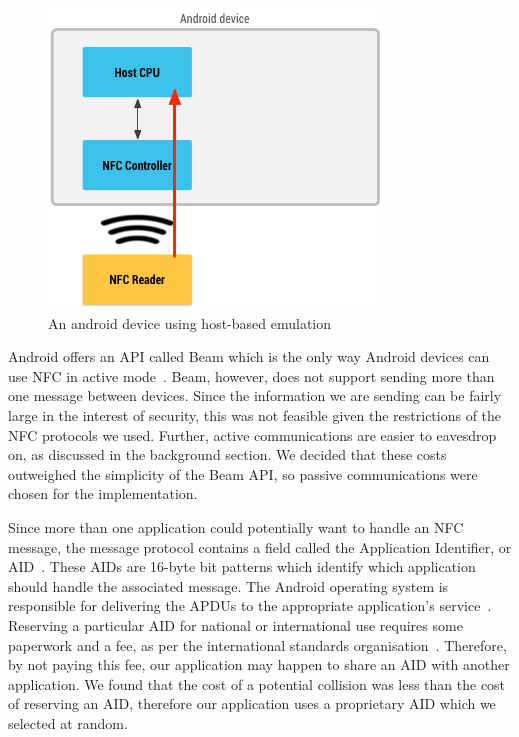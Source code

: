 \documentclass[12pt]{report}
\begin{document}
\begin{figure}[!h]
    \centering
    \includegraphics[width=0.6 \textwidth]{Diagrams/NFC-Diagrams/Android-Host-Based-Card}
    \caption[Host-based card emulation on an Android device]{An android device using host-based emulation~\autocite{ANDROIDHCE}}
    \label{fig:android-host-based}
\end{figure}

Android offers an API called Beam which is the only way Android devices can use NFC in active mode~\autocite{ANDROIDBEAM}. Beam,
however, does not support sending more than one message between devices. Since the information we are sending can be
fairly large in the interest of security, this was not feasible given the restrictions of the NFC protocols we used.
Further, active communications are easier to eavesdrop on, as discussed in the background section. We decided that these
costs outweighed the simplicity of the Beam API, so passive communications were chosen for the implementation.

Since more than one application could potentially want to handle an NFC message, the message protocol contains a field
called the Application Identifier, or AID~\autocite{AIDISO}. These AIDs are 16-byte bit patterns which identify which application should
handle the associated message. The Android operating system is responsible for delivering the APDUs to the
appropriate application's service~\autocite{ANDROIDAPDU}. Reserving a particular AID for national or international use requires some
paperwork and a fee, as per the international standards organisation~\autocite{AIDISO}. Therefore, by not paying this fee, our
application may happen to share an AID with another application. We found that the cost of a potential collision was
less than the cost of reserving an AID, therefore our application uses a proprietary AID which we selected at random.
\end{document}
